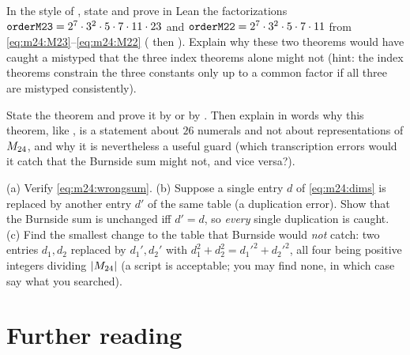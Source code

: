 \begin{exercise}\label{ex:m24:leantower}
In the style of , state and prove in Lean the factorizations
$\texttt{orderM23} = 2^7\cdot3^2\cdot5\cdot7\cdot11\cdot23$ and
$\texttt{orderM22}=2^7\cdot3^2\cdot5\cdot7\cdot11$ from \eqref{eq:m24:M23}--\eqref{eq:m24:M22}
( then ). Explain why these two theorems would have caught a
mistyped  that the three index theorems alone might not (hint: the index
theorems constrain the three constants only up to a common factor if all three are
mistyped consistently).
\end{exercise}

\begin{exercise}\label{ex:m24:leandiv}
State the theorem  and prove it by
 or by . Then explain in words why
this theorem, like , is a statement about $26$ numerals and not
about representations of $M_{24}$, and why it is nevertheless a useful guard (which
transcription errors would it catch that the Burnside sum might not, and vice versa?).
\end{exercise}

\begin{exercise}\label{ex:m24:wrongtable}
(a) Verify \eqref{eq:m24:wrongsum}. (b) Suppose a single entry $d$ of \eqref{eq:m24:dims}
is replaced by another entry $d'$ of the same table (a duplication error). Show that the
Burnside sum is unchanged iff $d'=d$, so \emph{every} single duplication is caught. (c) Find
the smallest change to the table that Burnside would \emph{not} catch: two entries
$d_1,d_2$ replaced by $d_1',d_2'$ with $d_1^2+d_2^2=d_1'^2+d_2'^2$, all four being
positive integers dividing $|M_{24}|$ (a script is acceptable; you may find none, in which
case say what you searched).
\end{exercise}

\section*{Further reading}

